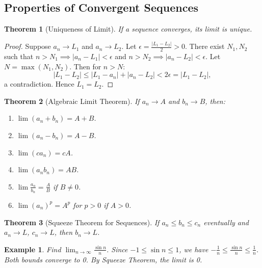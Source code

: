 \documentclass[11pt,a4paper]{article}
\newtheorem{example}{Example}
\newtheorem{theorem}{Theorem}
\begin{document}
\subsection{Properties of Convergent Sequences}
\begin{theorem}[Uniqueness of Limit]
If a sequence converges, its limit is unique.
\end{theorem}
\begin{proof}
Suppose $a_n \to L_1$ and $a_n \to L_2$. Let $\epsilon = \frac{|L_1 - L_2|}{2} > 0$. There exist $N_1, N_2$ such that $n > N_1 \implies |a_n - L_1| < \epsilon$ and $n > N_2 \implies |a_n - L_2| < \epsilon$. Let $N = \max(N_1, N_2)$. Then for $n > N$:
\[
|L_1 - L_2| \leq |L_1 - a_n| + |a_n - L_2| < 2\epsilon = |L_1 - L_2|,
\]
a contradiction. Hence $L_1 = L_2$.
\end{proof}
\begin{theorem}[Algebraic Limit Theorem]
If $a_n \to A$ and $b_n \to B$, then:
\begin{enumerate}
\item $\lim (a_n + b_n) = A + B$.
\item $\lim (a_n - b_n) = A - B$.
\item $\lim (c a_n) = cA$.
\item $\lim (a_n b_n) = AB$.
\item $\lim \frac{a_n}{b_n} = \frac{A}{B}$ if $B \neq 0$.
\item $\lim (a_n)^p = A^p$ for $p > 0$ if $A > 0$.
\end{enumerate}
\end{theorem}
\begin{theorem}[Squeeze Theorem for Sequences]
If $a_n \leq b_n \leq c_n$ eventually and $a_n \to L$, $c_n \to L$, then $b_n \to L$.
\end{theorem}
\begin{example}
Find $\lim_{n \to \infty} \frac{\sin n}{n}$.
Since $-1 \leq \sin n \leq 1$, we have $-\frac{1}{n} \leq \frac{\sin n}{n} \leq \frac{1}{n}$. Both bounds converge to 0. By Squeeze Theorem, the limit is 0.
\end{example}
\end{document}
